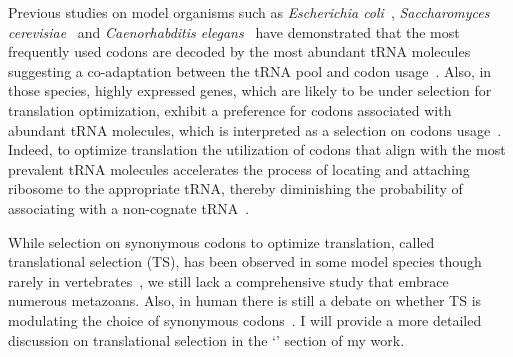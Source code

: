 Previous studies on model organisms such as \textit{Escherichia coli}~\citep{ikemura_correlation_1981}, \textit{Saccharomyces cerevisiae}~\citep{ikemura_codon_1985} and \textit{Caenorhabditis elegans}~\citep{duret_trna_2000} have demonstrated that the most frequently used codons are decoded by the most abundant \acrshort{tRNA} molecules suggesting a co-adaptation between the \acrshort{tRNA} pool and \gls{codon usage}~\citep{ikemura_codon_1985}. Also, in those species, highly expressed genes, which are likely to be under selection for translation optimization, exhibit a preference for codons associated with abundant tRNA molecules, which is interpreted as a selection on codons usage~\citep{ikemura_correlation_1981, percudani_transfer_1997, duret_trna_2000, plotkin_codon_2006, plotkin_synonymous_2011, quax_codon_2015}. Indeed, to optimize translation the utilization of codons that align with the most prevalent \acrshort{tRNA} molecules accelerates the process of locating and attaching ribosome to the appropriate tRNA, thereby diminishing the probability of associating with a non-cognate \acrshort{tRNA}~\citep{dana_effect_2014, quax_codon_2015}.

While selection on \gls{synonymous} codons to optimize translation, called \gls{translational selection} (\acrshort{TS}), has been observed in some model species though rarely in vertebrates~\citep{doherty_translational_2013}, we still lack a comprehensive study that embrace numerous metazoans. Also, in human there is still a debate on whether \acrshort{TS} is modulating the choice of \gls{synonymous} codons~\citep{comeron_selective_2004, semon_no_2006, doherty_translational_2013, gingold_dual_2014, pouyet_recombination_2017, dhindsa_natural_2020}. I will provide a more detailed discussion on \gls{translational selection} in the `' section of my work.
